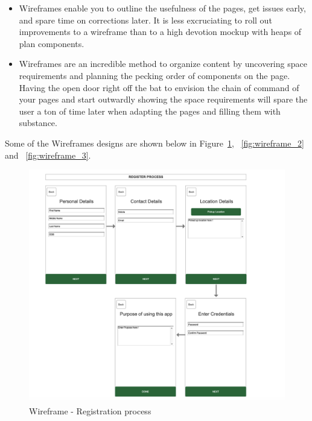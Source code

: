 \begin{itemize}
    \item Wireframes enable you to outline the usefulness of the pages, get issues early, and spare time on corrections later. It is less excruciating to roll out improvements to a wireframe than to a high devotion mockup with heaps of plan components. \\
    \item Wireframes are an incredible method to organize content by uncovering space requirements and planning the pecking order of components on the page. Having the open door right off the bat to envision the chain of command of your pages and start outwardly showing the space requirements will spare the user a ton of time later when adapting the pages and filling them with substance. \\
\end{itemize}

Some of the Wireframes designs are shown below in Figure~\ref{fig:wireframe_1}, ~\ref{fig:wireframe_2} and ~\ref{fig:wireframe_3}.

    \begin{figure}[H]
            \centering
            \includegraphics[width=1.0\linewidth]{figures/ch3/wireframe_1.png}
            \caption{\label{fig:wireframe_1} Wireframe - Registration process}
    \end{figure}
  
